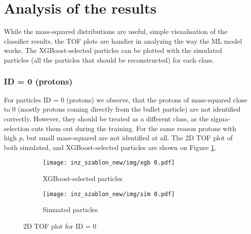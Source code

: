 \section{Analysis of the results}
While the mass-squared distributions are useful, simple visualisation of the classifier results, the TOF plots are handier in analyzing the way the ML model works. The XGBoost-selected particles can be plotted with the simulated particles (all the particles that should be reconstructed) for each class.

\subsubsection{ID = 0 (protons)}
For particles ID = 0 (protons) we observe, that the protons of mass-squared close to 0 (mostly protons coming directly from the bullet particle) are not identified correctly. However, they should be treated as a different class, as the sigma-selection cuts them out during the training. For the same reason protons with high $p$, but small mass-squared are not identified at all. The 2D TOF plot of both simulated, and XGBoost-selected particles are shown on Figure \ref{2D TOF id0}.
\begin{figure}[H]
 \centering
    \begin{subfigure}[b]{0.8\linewidth} 
        \centering
        \texttt{[image: inz\_szablon\_new/img/xgb 0.pdf]}
        \caption{XGBoost-selected particles}
        \vspace{0.3cm}
    \end{subfigure}
     \hfill
       \begin{subfigure}[b]{0.8\linewidth}
        \centering
        \texttt{[image: inz\_szablon\_new/img/sim 0.pdf]}
        \caption{Simuated particles}
        \vspace{0.3cm}
    \end{subfigure}
    \caption{2D TOF plot for ID = 0}
    \label{2D TOF id0}
\end{figure}
\clearpage


